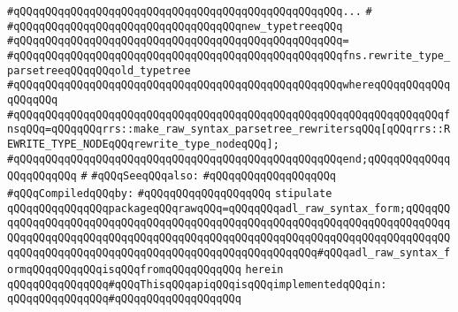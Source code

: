 \verb|#qQQqqQQqqQQqqQQqqQQqqQQqqQQqqQQqqQQqqQQqqQQqqQQqqQQq...|\newline
\verb|#|\newline
\verb|#qQQqqQQqqQQqqQQqqQQqqQQqqQQqqQQqqQQqnew_typetreeqQQq|\newline
\verb|#qQQqqQQqqQQqqQQqqQQqqQQqqQQqqQQqqQQqqQQqqQQqqQQqqQQq=|\newline
\verb|#qQQqqQQqqQQqqQQqqQQqqQQqqQQqqQQqqQQqqQQqqQQqqQQqqQQqfns.rewrite_type_parsetreeqQQqqQQqold_typetree|\newline
\verb|#qQQqqQQqqQQqqQQqqQQqqQQqqQQqqQQqqQQqqQQqqQQqqQQqqQQqwhereqQQqqQQqqQQqqQQqqQQq|\newline
\verb|#qQQqqQQqqQQqqQQqqQQqqQQqqQQqqQQqqQQqqQQqqQQqqQQqqQQqqQQqqQQqqQQqqQQqfnsqQQq=qQQqqQQqrrs::make_raw_syntax_parsetree_rewritersqQQq[qQQqrrs::REWRITE_TYPE_NODEqQQqrewrite_type_nodeqQQq];|\newline
\verb|#qQQqqQQqqQQqqQQqqQQqqQQqqQQqqQQqqQQqqQQqqQQqqQQqqQQqend;qQQqqQQqqQQqqQQqqQQqqQQq|\newline
\verb|#|\newline
\verb|#qQQqSeeqQQqalso:|\newline
\verb|#qQQqqQQqqQQqqQQqqQQq|\newline
\newline
\verb|#qQQqCompiledqQQqby:|\newline
\verb|#qQQqqQQqqQQqqQQqqQQq|\newline
\newline
\verb|stipulate|\newline
\verb|qQQqqQQqqQQqqQQqpackageqQQqrawqQQq=qQQqqQQqadl_raw_syntax_form;qQQqqQQqqQQqqQQqqQQqqQQqqQQqqQQqqQQqqQQqqQQqqQQqqQQqqQQqqQQqqQQqqQQqqQQqqQQqqQQqqQQqqQQqqQQqqQQqqQQqqQQqqQQqqQQqqQQqqQQqqQQqqQQqqQQqqQQqqQQqqQQqqQQqqQQqqQQqqQQqqQQqqQQqqQQqqQQqqQQqqQQqqQQqqQQqqQQq#qQQqadl_raw_syntax_formqQQqqQQqqQQqisqQQqfromqQQqqQQqqQQq|\newline
\verb|herein|\newline
\newline
\verb|qQQqqQQqqQQqqQQq#qQQqThisqQQqapiqQQqisqQQqimplementedqQQqin:|\newline
\verb|qQQqqQQqqQQqqQQq#qQQqqQQqqQQqqQQqqQQq|\newline
